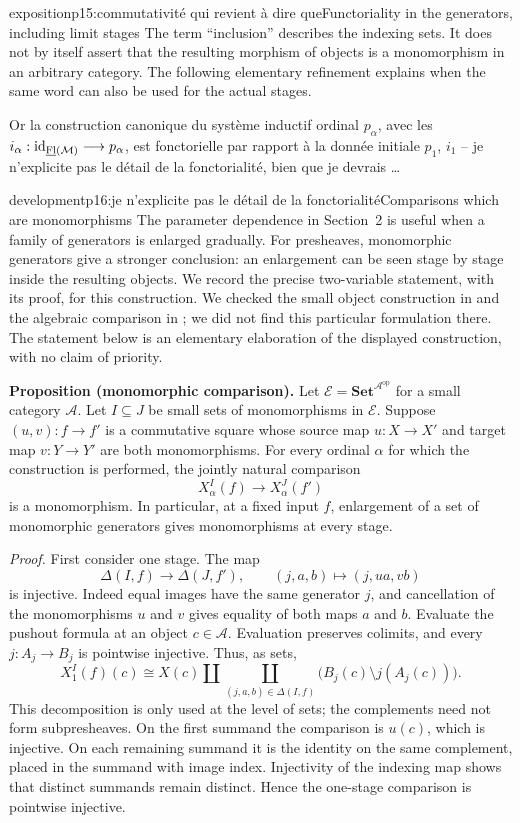 \begin{dcomment}{exposition}{p15:commutativité qui revient à dire que}{Functoriality in the generators, including limit stages}
The term ``inclusion'' describes the indexing sets. It does not by itself assert that the resulting morphism of objects is a monomorphism in an arbitrary category. The following elementary refinement explains when the same word can also be used for the actual stages.
\end{dcomment}


Or la construction canonique du système inductif ordinal $p_\alpha$, avec les $i_\alpha : \mathrm{id}_{\underline{\mathrm{Fl}}(\mathcal{M})}\longrightarrow p_\alpha$, est fonctorielle par rapport à la donnée initiale $p_1$, $i_1$ -- je n'explicite pas le détail de la fonctorialité, bien que je devrais \ldots

\begin{dcomment}{development}{p16:je n'explicite pas le détail de la fonctorialité}{Comparisons which are monomorphisms}
The parameter dependence in Section~2 is useful when a family of generators is enlarged gradually. For presheaves, monomorphic generators give a stronger conclusion: an enlargement can be seen stage by stage inside the resulting objects. We record the precise two-variable statement, with its proof, for this construction. We checked the small object construction in \citet[Section~12.2]{Riehl2014} and the algebraic comparison in \citet[Sections~3--4]{Garner2009}; we did not find this particular formulation there. The statement below is an elementary elaboration of the displayed construction, with no claim of priority.

\textbf{Proposition (monomorphic comparison).}\ours
Let $\mathcal E=\mathbf{Set}^{\mathcal A^{\mathrm{op}}}$ for a small category $\mathcal A$. Let $I\subseteq J$ be small sets of monomorphisms in $\mathcal E$. Suppose $(u,v):f\to f'$ is a commutative square whose source map $u:X\to X'$ and target map $v:Y\to Y'$ are both monomorphisms. For every ordinal $\alpha$ for which the construction is performed, the jointly natural comparison
\[
 X_\alpha^I(f)\longrightarrow X_\alpha^J(f')
\]
is a monomorphism. In particular, at a fixed input $f$, enlargement of a set of monomorphic generators gives monomorphisms at every stage.

\textit{Proof.} First consider one stage. The map
\[
 \Delta(I,f)\longrightarrow\Delta(J,f'),\qquad
 (j,a,b)\longmapsto(j,ua,vb)
\]
is injective. Indeed equal images have the same generator $j$, and cancellation of the monomorphisms $u$ and $v$ gives equality of both maps $a$ and $b$. Evaluate the pushout formula at an object $c\in\mathcal A$. Evaluation preserves colimits, and every $j:A_j\to B_j$ is pointwise injective. Thus, as sets,
\[
 X_1^I(f)(c)\cong X(c)\amalg
 \coprod_{(j,a,b)\in\Delta(I,f)}
 \bigl(B_j(c)\setminus j(A_j(c))\bigr).
\]
This decomposition is only used at the level of sets; the complements need not form subpresheaves. On the first summand the comparison is $u(c)$, which is injective. On each remaining summand it is the identity on the same complement, placed in the summand with image index. Injectivity of the indexing map shows that distinct summands remain distinct. Hence the one-stage comparison is pointwise injective.


\end{dcomment}
